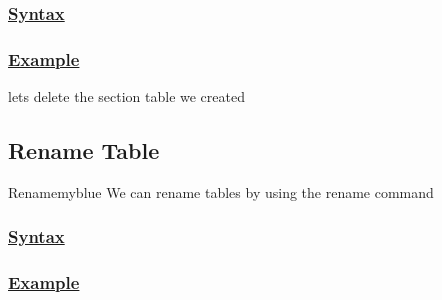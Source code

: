 \subsubsection*{\underline{Syntax}}



\subsubsection*{\underline{Example}}
lets delete the section table we created 



\subsection{Rename Table}

\begin{prettyBox}{Rename}{myblue}
We can rename tables by using the rename command 
\end{prettyBox}

\subsubsection*{\underline{Syntax}}



\subsubsection*{\underline{Example}}



